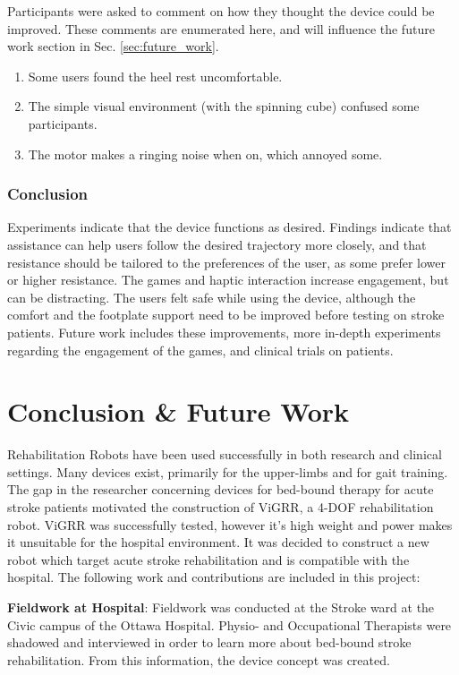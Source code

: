 \documentclass[12pt]{report}
\begin{document}
Participants were asked to comment on how they thought the device could be improved. These comments are enumerated here, and will influence the future work section in Sec. \ref{sec:future_work}. 		
		
		\begin{enumerate}
			\item Some users found the heel rest uncomfortable. 
			\item The simple visual environment (with the spinning cube) confused some participants.
			\item The motor makes a ringing noise when on, which annoyed some.
		
		
		\end{enumerate}
		
\subsection{Conclusion}

 Experiments indicate that the device functions as desired. Findings indicate that assistance can help users follow the desired trajectory more closely, and that resistance should be tailored to the preferences of the user, as some prefer lower or higher resistance. The games and haptic interaction increase engagement, but can be distracting. The users felt safe while using the device, although the comfort and the footplate support need to be improved before testing on stroke patients. Future work includes these improvements, more in-depth experiments regarding the engagement of the games, and clinical trials on patients. 
	
\chapter{Conclusion \& Future Work}

	Rehabilitation Robots have been used successfully in both research and clinical settings. Many devices exist, primarily for the upper-limbs and for gait training. The gap in the researcher concerning devices for bed-bound therapy for acute stroke patients motivated the construction of ViGRR, a 4-DOF rehabilitation robot. ViGRR was successfully tested, however it's high weight and power makes it unsuitable for the hospital environment. It was decided to construct a new robot which target acute stroke rehabilitation and is compatible with the hospital. The following work and contributions are included in this project: 
	
	\textbf{Fieldwork at Hospital}: Fieldwork was conducted at the Stroke ward at the Civic campus of the Ottawa Hospital. Physio- and Occupational Therapists were shadowed and interviewed in order to learn more about bed-bound stroke rehabilitation. From this information, the device concept was created.
	
\end{document}
